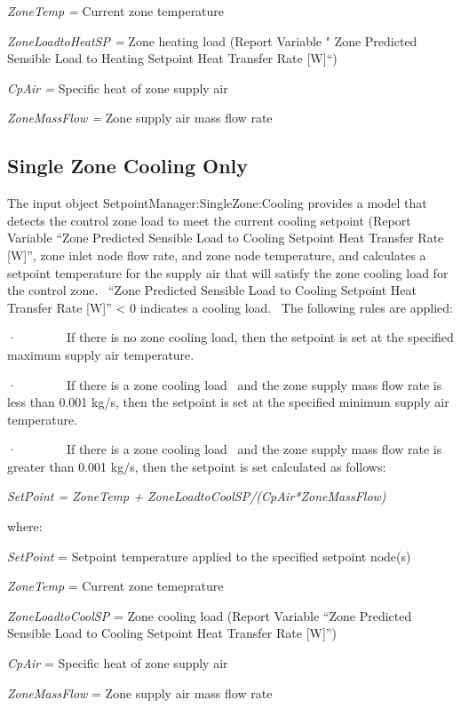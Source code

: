 \emph{ZoneTemp =} Current zone temperature

\emph{ZoneLoadtoHeatSP =} Zone heating load (Report Variable " Zone Predicted Sensible Load to Heating Setpoint Heat Transfer Rate {[}W{]}``)

\emph{CpAir =} Specific heat of zone supply air

\emph{ZoneMassFlow =} Zone supply air mass flow rate

\subsection{Single Zone Cooling Only}\label{single-zone-cooling-only}

The input object SetpointManager:SingleZone:Cooling provides a model that detects the control zone load to meet the current cooling setpoint (Report Variable ``Zone Predicted Sensible Load to Cooling Setpoint Heat Transfer Rate {[}W{]}'', zone inlet node flow rate, and zone node temperature, and calculates a setpoint temperature for the supply air that will satisfy the zone cooling load for the control zone.~ ``Zone Predicted Sensible Load to Cooling Setpoint Heat Transfer Rate {[}W{]}'' \textless{} 0 indicates a cooling load.~ The following rules are applied:

·~~~~~~~~If there is no zone cooling load, then the setpoint is set at the specified maximum supply air temperature.

·~~~~~~~~If there is a zone cooling load~ and the zone supply mass flow rate is less than 0.001 kg/s, then the setpoint is set at the specified minimum supply air temperature.

·~~~~~~~~If there is a zone cooling load~ and the zone supply mass flow rate is greater than 0.001 kg/s, then the setpoint is set calculated as follows:

\emph{SetPoint = ZoneTemp + ZoneLoadtoCoolSP/(CpAir*ZoneMassFlow)}

where:

\emph{SetPoint} = Setpoint temperature applied to the specified setpoint node(s)

\emph{ZoneTemp} = Current zone temeprature

\emph{ZoneLoadtoCoolSP} = Zone cooling load (Report Variable ``Zone Predicted Sensible Load to Cooling Setpoint Heat Transfer Rate {[}W{]}'')

\emph{CpAir} = Specific heat of zone supply air

\emph{ZoneMassFlow} = Zone supply air mass flow rate


